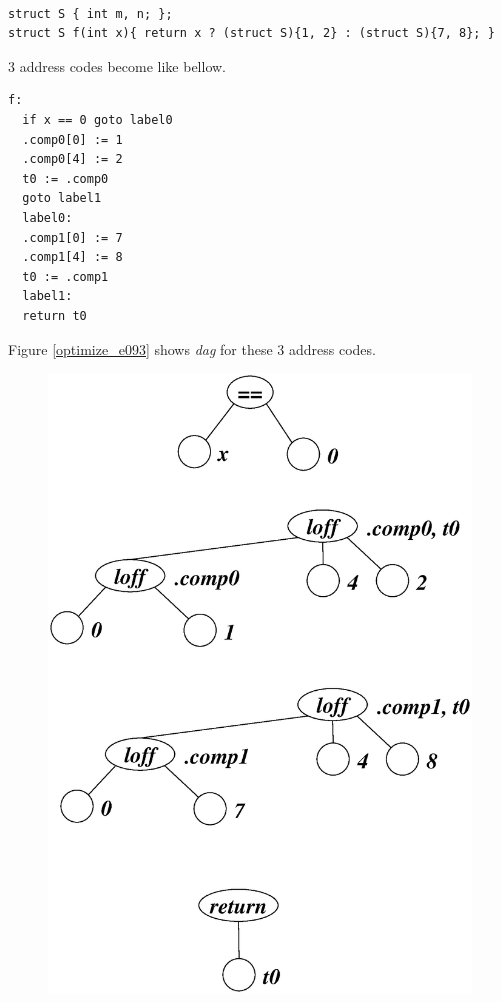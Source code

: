 \begin{Example}
\label{optimize_e092}
\begin{verbatim}

struct S { int m, n; };
struct S f(int x){ return x ? (struct S){1, 2} : (struct S){7, 8}; }
\end{verbatim}
3 address codes become like bellow.
\begin{verbatim}
f:
  if x == 0 goto label0
  .comp0[0] := 1
  .comp0[4] := 2
  t0 := .comp0
  goto label1
  label0:
  .comp1[0] := 7
  .comp1[4] := 8
  t0 := .comp1
  label1:
  return t0
\end{verbatim}
Figure \ref{optimize_e093} shows {\em dag} for these 3 address codes.
\begin{figure}[htbp]
\begin{center}
\includegraphics[width=1.0\linewidth,height=1.4\linewidth]{opt040.eps}

\end{center}
\end{figure}
\end{Example}
